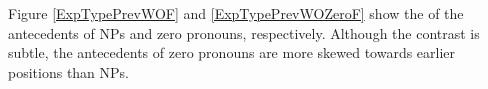 
Figure \ref{ExpTypePrevWOF} and \ref{ExpTypePrevWOZeroF} show the  of the antecedents of NPs and zero pronouns, respectively.
Although the contrast is subtle,
the antecedents of zero pronouns are more skewed towards earlier positions than NPs.


